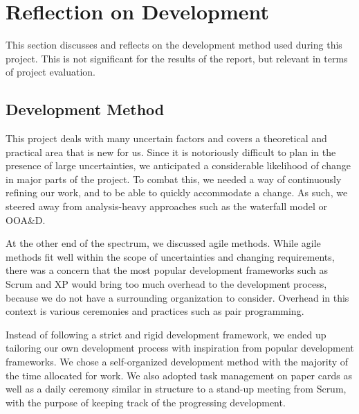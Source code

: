 \section{Reflection on Development}\label{chap:devmethodreflection}
This section discusses and reflects on the development method used during this project. This is not significant for the results of the report, but relevant in terms of project evaluation.

\subsection{Development Method}
This project deals with many uncertain factors and covers a theoretical and practical area that is new for us. Since it is notoriously difficult to plan in the presence of large uncertainties, we anticipated a considerable likelihood of change in major parts of the project. To combat this, we needed a way of continuously refining our work, and to be able to quickly accommodate a change. As such, we steered away from analysis-heavy approaches such as the waterfall model or OOA\&D\@.

At the other end of the spectrum, we discussed agile methods. While agile methods fit well within the scope of uncertainties and changing requirements, there was a concern that the most popular development frameworks such as Scrum and XP would bring too much overhead to the development process, because we do not have a surrounding organization to consider. Overhead in this context is various ceremonies and practices such as pair programming. %

Instead of following a strict and rigid development framework, we ended up tailoring our own development process with inspiration from popular development frameworks. We chose a self-organized development method with the majority of the time allocated for work. We also adopted task management on paper cards as well as a daily ceremony similar in structure to a stand-up meeting from Scrum, with the purpose of keeping track of the progressing development.

